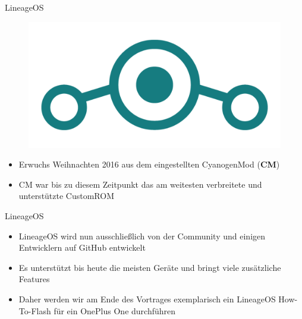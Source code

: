 \begin{frame}{LineageOS}
	\begin{figure}
		\includegraphics[scale=0.25]{resources/Lineage_OS_Logo.png}
	\end{figure}
	\begin{itemize}[<+->]
		\item Erwuchs Weihnachten 2016 aus dem eingestellten CyanogenMod (\textbf{CM})
		\item CM war bis zu diesem Zeitpunkt das am weitesten verbreitete und unterstützte CustomROM
	\end{itemize}
\end{frame}

\begin{frame}{LineageOS}
	\begin{itemize}[<+->]
		\item LineageOS wird nun ausschließlich von der Community und einigen Entwicklern auf GitHub entwickelt
		\item Es unterstützt bis heute die meisten Geräte und bringt viele zusätzliche Features
		\item Daher werden wir am Ende des Vortrages exemplarisch ein LineageOS How-To-Flash für ein OnePlus One durchführen
	\end{itemize}
\end{frame}
